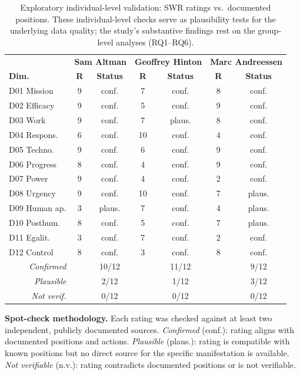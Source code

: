 \documentclass[12pt,a4paper]{article}
\begin{document}
\begin{table}[htbp]
  \centering
  \caption{Exploratory individual-level validation: SWR ratings vs.\ documented positions. These individual-level checks serve as plausibility tests for the underlying data quality; the study's substantive findings rest on the group-level analyses (RQ1--RQ6).}
  \label{tab:spotchecks}
  \footnotesize
  \begin{tabular}{@{} l c c c c c c @{}}
    \toprule
    & \multicolumn{2}{c}{\textbf{Sam Altman}} & \multicolumn{2}{c}{\textbf{Geoffrey Hinton}} & \multicolumn{2}{c}{\textbf{Marc Andreessen}} \\
    \textbf{Dim.} & \textbf{R} & \textbf{Status} & \textbf{R} & \textbf{Status} & \textbf{R} & \textbf{Status} \\
    \midrule
    D01 Mission  & 9 & conf. & 7 & conf. & 8 & conf. \\
    D02 Efficacy & 9 & conf. & 5 & conf. & 9 & conf. \\
    D03 Work     & 9 & conf. & 7 & plaus. & 8 & conf. \\
    D04 Respons. & 6 & conf. & 10 & conf. & 4 & conf. \\
    \addlinespace[3pt]
    D05 Techno.  & 9 & conf. & 6 & conf. & 9 & conf. \\
    D06 Progress & 8 & conf. & 4 & conf. & 9 & conf. \\
    D07 Power    & 9 & conf. & 4 & conf. & 2 & conf. \\
    D08 Urgency  & 9 & conf. & 10 & conf. & 7 & plaus. \\
    \addlinespace[3pt]
    D09 Human ap.& 3 & plaus. & 7 & conf. & 4 & plaus. \\
    D10 Posthum. & 8 & conf. & 5 & conf. & 7 & plaus. \\
    D11 Egalit.  & 3 & conf. & 7 & conf. & 2 & conf. \\
    D12 Control  & 8 & conf. & 3 & conf. & 8 & conf. \\
    \midrule
    \multicolumn{1}{r}{\textit{Confirmed}} & & 10/12 & & 11/12 & & 9/12 \\
    \multicolumn{1}{r}{\textit{Plausible}} & & 2/12 & & 1/12 & & 3/12 \\
    \multicolumn{1}{r}{\textit{Not verif.}} & & 0/12 & & 0/12 & & 0/12 \\
    \bottomrule
  \end{tabular}
\end{table}

\noindent\textbf{Spot-check methodology.} Each rating was checked against at least two independent, publicly documented sources. \emph{Confirmed} (conf.): rating aligns with documented positions and actions. \emph{Plausible} (plaus.): rating is compatible with known positions but no direct source for the specific manifestation is available. \emph{Not verifiable} (n.v.): rating contradicts documented positions or is not verifiable.
\end{document}
